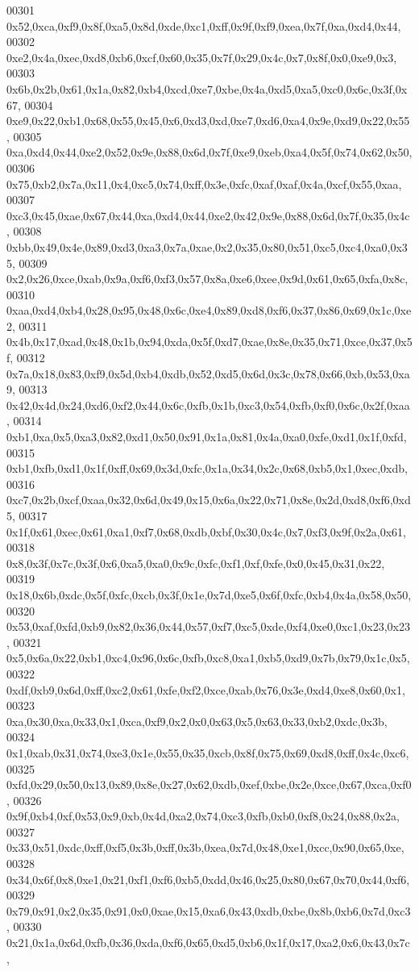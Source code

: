 \begin{DoxyCode}
00301   0x52,0xca,0xf9,0x8f,0xa5,0x8d,0xde,0xc1,0xff,0x9f,0xf9,0xea,0x7f,0xa,0xd4,0x44,
00302   0xe2,0x4a,0xec,0xd8,0xb6,0xcf,0x60,0x35,0x7f,0x29,0x4c,0x7,0x8f,0x0,0xe9,0x3,
00303   0x6b,0x2b,0x61,0x1a,0x82,0xb4,0xcd,0xe7,0xbe,0x4a,0xd5,0xa5,0xc0,0x6c,0x3f,0x67,
00304   0xe9,0x22,0xb1,0x68,0x55,0x45,0x6,0xd3,0xd,0xe7,0xd6,0xa4,0x9e,0xd9,0x22,0x55,
00305   0xa,0xd4,0x44,0xe2,0x52,0x9e,0x88,0x6d,0x7f,0xe9,0xeb,0xa4,0x5f,0x74,0x62,0x50,
00306   0x75,0xb2,0x7a,0x11,0x4,0xc5,0x74,0xff,0x3e,0xfc,0xaf,0xaf,0x4a,0xcf,0x55,0xaa,
00307   0xc3,0x45,0xae,0x67,0x44,0xa,0xd4,0x44,0xe2,0x42,0x9e,0x88,0x6d,0x7f,0x35,0x4c,
00308   0xbb,0x49,0x4e,0x89,0xd3,0xa3,0x7a,0xae,0x2,0x35,0x80,0x51,0xc5,0xc4,0xa0,0x35,
00309   0x2,0x26,0xce,0xab,0x9a,0xf6,0xf3,0x57,0x8a,0xe6,0xee,0x9d,0x61,0x65,0xfa,0x8c,
00310   0xaa,0xd4,0xb4,0x28,0x95,0x48,0x6c,0xe4,0x89,0xd8,0xf6,0x37,0x86,0x69,0x1c,0xe2,
00311   0x4b,0x17,0xad,0x48,0x1b,0x94,0xda,0x5f,0xd7,0xae,0x8e,0x35,0x71,0xce,0x37,0x5f,
00312   0x7a,0x18,0x83,0xf9,0x5d,0xb4,0xdb,0x52,0xd5,0x6d,0x3c,0x78,0x66,0xb,0x53,0xa9,
00313   0x42,0x4d,0x24,0xd6,0xf2,0x44,0x6c,0xfb,0x1b,0xc3,0x54,0xfb,0xf0,0x6c,0x2f,0xaa,
00314   0xb1,0xa,0x5,0xa3,0x82,0xd1,0x50,0x91,0x1a,0x81,0x4a,0xa0,0xfe,0xd1,0x1f,0xfd,
00315   0xb1,0xfb,0xd1,0x1f,0xff,0x69,0x3d,0xfc,0x1a,0x34,0x2c,0x68,0xb5,0x1,0xec,0xdb,
00316   0xc7,0x2b,0xcf,0xaa,0x32,0x6d,0x49,0x15,0x6a,0x22,0x71,0x8e,0x2d,0xd8,0xf6,0xd5,
00317   0x1f,0x61,0xec,0x61,0xa1,0xf7,0x68,0xdb,0xbf,0x30,0x4c,0x7,0xf3,0x9f,0x2a,0x61,
00318   0x8,0x3f,0x7c,0x3f,0x6,0xa5,0xa0,0x9c,0xfc,0xf1,0xf,0xfe,0x0,0x45,0x31,0x22,
00319   0x18,0x6b,0xdc,0x5f,0xfc,0xcb,0x3f,0x1e,0x7d,0xe5,0x6f,0xfc,0xb4,0x4a,0x58,0x50,
00320   0x53,0xaf,0xfd,0xb9,0x82,0x36,0x44,0x57,0xf7,0xc5,0xde,0xf4,0xe0,0xc1,0x23,0x23,
00321   0x5,0x6a,0x22,0xb1,0xc4,0x96,0x6c,0xfb,0xc8,0xa1,0xb5,0xd9,0x7b,0x79,0x1c,0x5,
00322   0xdf,0xb9,0x6d,0xff,0xc2,0x61,0xfe,0xf2,0xce,0xab,0x76,0x3e,0xd4,0xe8,0x60,0x1,
00323   0xa,0x30,0xa,0x33,0x1,0xca,0xf9,0x2,0x0,0x63,0x5,0x63,0x33,0xb2,0xdc,0x3b,
00324   0x1,0xab,0x31,0x74,0xe3,0x1e,0x55,0x35,0xcb,0x8f,0x75,0x69,0xd8,0xff,0x4c,0xc6,
00325   0xfd,0x29,0x50,0x13,0x89,0x8e,0x27,0x62,0xdb,0xef,0xbe,0x2e,0xce,0x67,0xca,0xf0,
00326   0x9f,0xb4,0xf,0x53,0x9,0xb,0x4d,0xa2,0x74,0xc3,0xfb,0xb0,0xf8,0x24,0x88,0x2a,
00327   0x33,0x51,0xdc,0xff,0xf5,0x3b,0xff,0x3b,0xea,0x7d,0x48,0xe1,0xcc,0x90,0x65,0xe,
00328   0x34,0x6f,0x8,0xe1,0x21,0xf1,0xf6,0xb5,0xdd,0x46,0x25,0x80,0x67,0x70,0x44,0xf6,
00329   0x79,0x91,0x2,0x35,0x91,0x0,0xae,0x15,0xa6,0x43,0xdb,0xbe,0x8b,0xb6,0x7d,0xc3,
00330   0x21,0x1a,0x6d,0xfb,0x36,0xda,0xf6,0x65,0xd5,0xb6,0x1f,0x17,0xa2,0x6,0x43,0x7c,

\end{DoxyCode}
